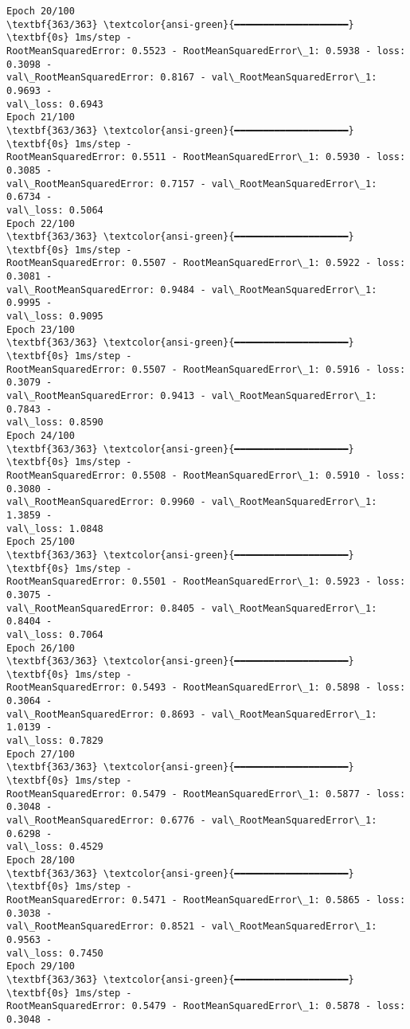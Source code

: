 \documentclass[12pt letter]{report}
\begin{document}
\begin{Verbatim}[commandchars=\\\{\}]
Epoch 20/100
\textbf{363/363} \textcolor{ansi-green}{━━━━━━━━━━━━━━━━━━━━} \textbf{0s} 1ms/step -
RootMeanSquaredError: 0.5523 - RootMeanSquaredError\_1: 0.5938 - loss: 0.3098 -
val\_RootMeanSquaredError: 0.8167 - val\_RootMeanSquaredError\_1: 0.9693 -
val\_loss: 0.6943
Epoch 21/100
\textbf{363/363} \textcolor{ansi-green}{━━━━━━━━━━━━━━━━━━━━} \textbf{0s} 1ms/step -
RootMeanSquaredError: 0.5511 - RootMeanSquaredError\_1: 0.5930 - loss: 0.3085 -
val\_RootMeanSquaredError: 0.7157 - val\_RootMeanSquaredError\_1: 0.6734 -
val\_loss: 0.5064
Epoch 22/100
\textbf{363/363} \textcolor{ansi-green}{━━━━━━━━━━━━━━━━━━━━} \textbf{0s} 1ms/step -
RootMeanSquaredError: 0.5507 - RootMeanSquaredError\_1: 0.5922 - loss: 0.3081 -
val\_RootMeanSquaredError: 0.9484 - val\_RootMeanSquaredError\_1: 0.9995 -
val\_loss: 0.9095
Epoch 23/100
\textbf{363/363} \textcolor{ansi-green}{━━━━━━━━━━━━━━━━━━━━} \textbf{0s} 1ms/step -
RootMeanSquaredError: 0.5507 - RootMeanSquaredError\_1: 0.5916 - loss: 0.3079 -
val\_RootMeanSquaredError: 0.9413 - val\_RootMeanSquaredError\_1: 0.7843 -
val\_loss: 0.8590
Epoch 24/100
\textbf{363/363} \textcolor{ansi-green}{━━━━━━━━━━━━━━━━━━━━} \textbf{0s} 1ms/step -
RootMeanSquaredError: 0.5508 - RootMeanSquaredError\_1: 0.5910 - loss: 0.3080 -
val\_RootMeanSquaredError: 0.9960 - val\_RootMeanSquaredError\_1: 1.3859 -
val\_loss: 1.0848
Epoch 25/100
\textbf{363/363} \textcolor{ansi-green}{━━━━━━━━━━━━━━━━━━━━} \textbf{0s} 1ms/step -
RootMeanSquaredError: 0.5501 - RootMeanSquaredError\_1: 0.5923 - loss: 0.3075 -
val\_RootMeanSquaredError: 0.8405 - val\_RootMeanSquaredError\_1: 0.8404 -
val\_loss: 0.7064
Epoch 26/100
\textbf{363/363} \textcolor{ansi-green}{━━━━━━━━━━━━━━━━━━━━} \textbf{0s} 1ms/step -
RootMeanSquaredError: 0.5493 - RootMeanSquaredError\_1: 0.5898 - loss: 0.3064 -
val\_RootMeanSquaredError: 0.8693 - val\_RootMeanSquaredError\_1: 1.0139 -
val\_loss: 0.7829
Epoch 27/100
\textbf{363/363} \textcolor{ansi-green}{━━━━━━━━━━━━━━━━━━━━} \textbf{0s} 1ms/step -
RootMeanSquaredError: 0.5479 - RootMeanSquaredError\_1: 0.5877 - loss: 0.3048 -
val\_RootMeanSquaredError: 0.6776 - val\_RootMeanSquaredError\_1: 0.6298 -
val\_loss: 0.4529
Epoch 28/100
\textbf{363/363} \textcolor{ansi-green}{━━━━━━━━━━━━━━━━━━━━} \textbf{0s} 1ms/step -
RootMeanSquaredError: 0.5471 - RootMeanSquaredError\_1: 0.5865 - loss: 0.3038 -
val\_RootMeanSquaredError: 0.8521 - val\_RootMeanSquaredError\_1: 0.9563 -
val\_loss: 0.7450
Epoch 29/100
\textbf{363/363} \textcolor{ansi-green}{━━━━━━━━━━━━━━━━━━━━} \textbf{0s} 1ms/step -
RootMeanSquaredError: 0.5479 - RootMeanSquaredError\_1: 0.5878 - loss: 0.3048 -

\end{Verbatim}
\end{document}
